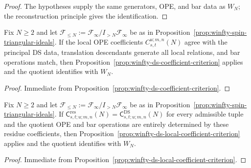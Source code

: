 \begin{proof}
The hypotheses supply the same generators, OPE, and bar data as $W_N$; the reconstruction principle gives the identification.
\end{proof}

\begin{proposition}
\label{prop:winfty-ds-local-coefficient-criterion}
Fix $N \ge 2$ and let
$\mathcal{F}_{\le N}:=\mathcal{F}_\infty/I_{>N}\mathcal{F}_\infty$
be as in
Proposition~\ref{prop:winfty-spin-triangular-ideals}.  If the local
OPE coefficients $C_{s,t}^{u;m,n}(N)$ agree with the principal DS data,
translation descendants generate all local relations, and bar operations
match, then Proposition~\ref{prop:winfty-ds-coefficient-criterion}
applies and the quotient identifies with $W_N$.
\end{proposition}

\begin{proof}
Immediate from Proposition~\ref{prop:winfty-ds-coefficient-criterion}.
\end{proof}

\begin{proposition}
\label{prop:winfty-ds-residue-identity-criterion}
Fix $N \ge 2$ and let
$\mathcal{F}_{\le N}:=\mathcal{F}_\infty/I_{>N}\mathcal{F}_\infty$
be as in Proposition~\ref{prop:winfty-spin-triangular-ideals}.
If $\mathsf{C}^{\mathrm{res}}_{s,t;u;m,n}(N)
= \mathsf{C}^{\mathrm{DS}}_{s,t;u;m,n}(N)$
for every admissible tuple and the quotient OPE and bar operations are
entirely determined by these residue coefficients, then
Proposition~\ref{prop:winfty-ds-local-coefficient-criterion} applies
and the quotient identifies with $W_N$.
\end{proposition}

\begin{proof}
Immediate from Proposition~\ref{prop:winfty-ds-local-coefficient-criterion}.
\end{proof}

